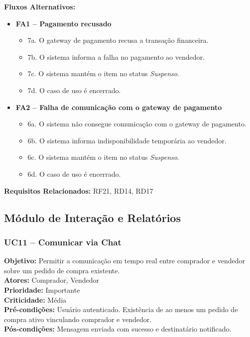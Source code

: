 \documentclass[
	article,			%
	11pt,				%
	oneside,			%
	a4paper,			%
	english,			%
	brazil,				%
	sumario=tradicional
	]{abntex2}
\begin{document}
\vspace{0.5em}
\noindent\textbf{Fluxos Alternativos:}
\begin{itemize}[leftmargin=*]
    \item \textbf{FA1 – Pagamento recusado}
    \begin{itemize}[label={}, leftmargin=0.5cm]
        \item 7a. O gateway de pagamento recusa a transação financeira.
        \item 7b. O sistema informa a falha no pagamento ao vendedor.
        \item 7c. O sistema mantém o item no status \textit{Suspenso}.
        \item 7d. O caso de uso é encerrado.
    \end{itemize}
    
    \item \textbf{FA2 – Falha de comunicação com o gateway de pagamento}
    \begin{itemize}[label={}, leftmargin=0.5cm]
        \item 6a. O sistema não consegue comunicação com o gateway de pagamento.
        \item 6b. O sistema informa indisponibilidade temporária ao vendedor.
        \item 6c. O sistema mantém o item no status \textit{Suspenso}.
        \item 6d. O caso de uso é encerrado.
    \end{itemize}
\end{itemize}

\vspace{0.5em}
\noindent\textbf{Requisitos Relacionados:} RF21, RD14, RD17

\subsection{Módulo de Interação e Relatórios}

\subsubsection{UC11 – Comunicar via Chat}
\label{uc:11}
\noindent\textbf{Objetivo:} Permitir a comunicação em tempo real entre comprador e vendedor sobre um pedido de compra existente.\\
\textbf{Atores:} Comprador, Vendedor\\
\textbf{Prioridade:} Importante\\
\textbf{Criticidade:} Média\\
\textbf{Pré-condições:} Usuário autenticado. Existência de ao menos um pedido de compra ativo vinculando comprador e vendedor.\\
\textbf{Pós-condições:} Mensagem enviada com sucesso e destinatário notificado.
\end{document}
